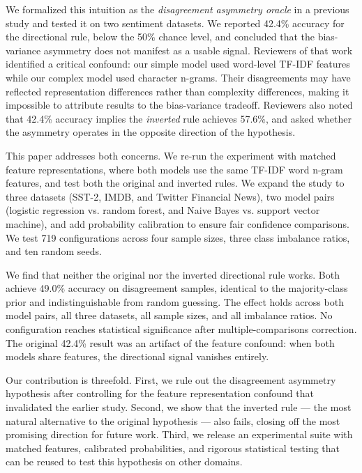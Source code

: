 \documentclass[11pt,letterpaper]{article}
\begin{document}
We formalized this intuition as the \textit{disagreement asymmetry oracle} in a previous study and tested it on two sentiment datasets. We reported 42.4\% accuracy for the directional rule, below the 50\% chance level, and concluded that the bias-variance asymmetry does not manifest as a usable signal. Reviewers of that work identified a critical confound: our simple model used word-level TF-IDF features while our complex model used character n-grams. Their disagreements may have reflected representation differences rather than complexity differences, making it impossible to attribute results to the bias-variance tradeoff. Reviewers also noted that 42.4\% accuracy implies the \textit{inverted} rule achieves 57.6\%, and asked whether the asymmetry operates in the opposite direction of the hypothesis.

This paper addresses both concerns. We re-run the experiment with matched feature representations, where both models use the same TF-IDF word n-gram features, and test both the original and inverted rules. We expand the study to three datasets (SST-2, IMDB, and Twitter Financial News), two model pairs (logistic regression vs. random forest, and Naive Bayes vs. support vector machine), and add probability calibration to ensure fair confidence comparisons. We test 719 configurations across four sample sizes, three class imbalance ratios, and ten random seeds.

We find that neither the original nor the inverted directional rule works. Both achieve 49.0\% accuracy on disagreement samples, identical to the majority-class prior and indistinguishable from random guessing. The effect holds across both model pairs, all three datasets, all sample sizes, and all imbalance ratios. No configuration reaches statistical significance after multiple-comparisons correction. The original 42.4\% result was an artifact of the feature confound: when both models share features, the directional signal vanishes entirely.

Our contribution is threefold. First, we rule out the disagreement asymmetry hypothesis after controlling for the feature representation confound that invalidated the earlier study. Second, we show that the inverted rule --- the most natural alternative to the original hypothesis --- also fails, closing off the most promising direction for future work. Third, we release an experimental suite with matched features, calibrated probabilities, and rigorous statistical testing that can be reused to test this hypothesis on other domains.
\end{document}
